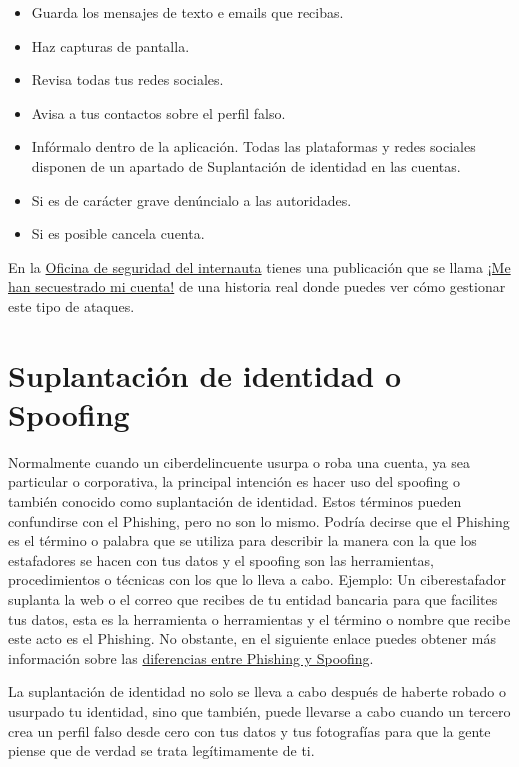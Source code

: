 \documentclass[
  spanish,
  a4paper,
  openany]{book}
\begin{document}
\begin{itemize}
\item
  Guarda los mensajes de texto e emails que recibas.
\item
  Haz capturas de pantalla.
\item
  Revisa todas tus redes sociales.
\item
  Avisa a tus contactos sobre el perfil falso.
\item
  Infórmalo dentro de la aplicación. Todas las plataformas y redes sociales disponen de un apartado de Suplantación de identidad en las cuentas.
\item
  Si es de carácter grave denúncialo a las autoridades.
\item
  Si es posible cancela cuenta.
\end{itemize}

En la \href{https://www.osi.es/es}{Oficina de seguridad del internauta} tienes una publicación que se llama \href{https://www.osi.es/es/actualidad/historias-reales/2021/03/05/me-han-secuestrado-mi-cuenta}{¡Me han secuestrado mi cuenta!} de una historia real donde puedes ver cómo gestionar este tipo de ataques.

\hypertarget{suplantaciuxf3n-de-identidad-o-spoofing}{%
\section{Suplantación de identidad o Spoofing}\label{suplantaciuxf3n-de-identidad-o-spoofing}}

Normalmente cuando un ciberdelincuente usurpa o roba una cuenta, ya sea particular o corporativa, la principal intención es hacer uso del spoofing o también conocido como suplantación de identidad. Estos términos pueden confundirse con el Phishing, pero no son lo mismo. Podría decirse que el Phishing es el término o palabra que se utiliza para describir la manera con la que los estafadores se hacen con tus datos y el spoofing son las herramientas, procedimientos o técnicas con los que lo lleva a cabo. Ejemplo: Un ciberestafador suplanta la web o el correo que recibes de tu entidad bancaria para que facilites tus datos, esta es la herramienta o herramientas y el término o nombre que recibe este acto es el Phishing. No obstante, en el siguiente enlace puedes obtener más información sobre las \href{https://techlandia.com/diferencia-phishing-spoofing-info_241711/}{diferencias entre Phishing y Spoofing}.

La suplantación de identidad no solo se lleva a cabo después de haberte robado o usurpado tu identidad, sino que también, puede llevarse a cabo cuando un tercero crea un perfil falso desde cero con tus datos y tus fotografías para que la gente piense que de verdad se trata legítimamente de ti.
\end{document}
